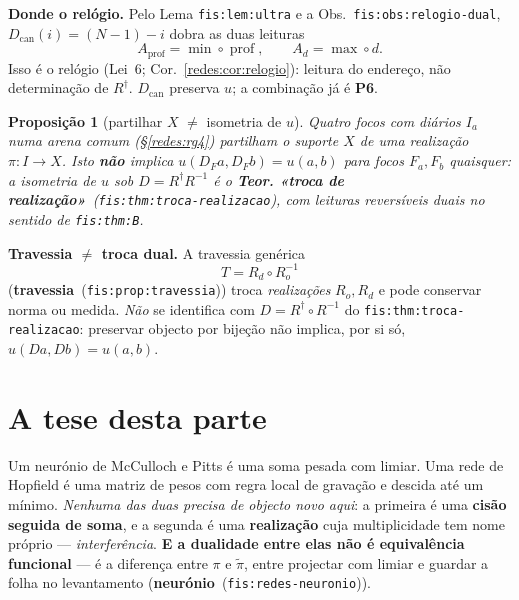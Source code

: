 \documentclass[11pt,a4paper]{article}
\newcommand{\code}[1]{\texttt{\small #1}}
\newcommand{\fis}[2]{\textbf{#2}~\textnormal{(\code{#1})}}
\providecommand{\pt}[1]{\textbf{P#1}}
\newtheorem{proposicao}[teorema]{Proposição}
\begin{document}
\medskip\noindent\textbf{Donde o relógio.} Pelo Lema \code{fis:lem:ultra} e a
Obs.~\code{fis:obs:relogio-dual}, $D_{\mathrm{can}}(i)=(N-1)-i$ dobra as duas
leituras
\[
A_{\mathrm{prof}}=\min\circ\operatorname{prof},\qquad A_d=\max\circ d.
\]
Isso é o relógio (Lei~6; Cor.~\ref{redes:cor:relogio}): leitura do endereço,
não determinação de $R^{\dagger}$. $D_{\mathrm{can}}$
preserva $u$; a combinação já é \pt{6}.

\begin{proposicao}[partilhar $X$ $\neq$ isometria de $u$]\label{redes:prop-troca}
Quatro focos com diários $I_a$ numa arena comum (§\ref{redes:rg4}) partilham o
\emph{suporte} $X$ de uma realização $\pi\colon I\to X$. Isto \textbf{não} implica
$u(D_Fa,D_Fb)=u(a,b)$ para focos $F_a,F_b$ quaisquer: a isometria de $u$ sob
$D=R^{\dagger}R^{-1}$ é o \fis{fis:thm:troca-realizacao}{Teor. «troca de
realização»}, com leituras reversíveis duais no sentido de \code{fis:thm:B}.
\end{proposicao}

\medskip\noindent\textbf{Travessia $\neq$ troca dual.} A travessia genérica
\[
T=R_d\circ R_o^{-1}
\]
(\fis{fis:prop:travessia}{travessia}) troca \emph{realizações} $R_o,R_d$ e pode
conservar norma ou medida. \emph{Não} se identifica com
$D=R^{\dagger}\circ R^{-1}$ do \code{fis:thm:troca-realizacao}: preservar objecto
por bijeção não implica, por si só, $u(Da,Db)=u(a,b)$.

\section*{A tese desta parte}\label{redes:tese}

\noindent Um neurónio de McCulloch e Pitts é uma soma pesada com limiar. Uma rede
de Hopfield é uma matriz de pesos com regra local de gravação e descida até um
mínimo. \emph{Nenhuma das duas precisa de objecto novo aqui}: a primeira é uma
\textbf{cisão seguida de soma}, e a segunda é uma \textbf{realização} cuja
multiplicidade tem nome próprio --- \emph{interferência}. \textbf{E a dualidade
entre elas não é equivalência funcional} --- é a diferença entre $\pi$ e
$\tilde\pi$, entre projectar com limiar e guardar a folha no levantamento
(\fis{fis:redes-neuronio}{neurónio}).
\end{document}
